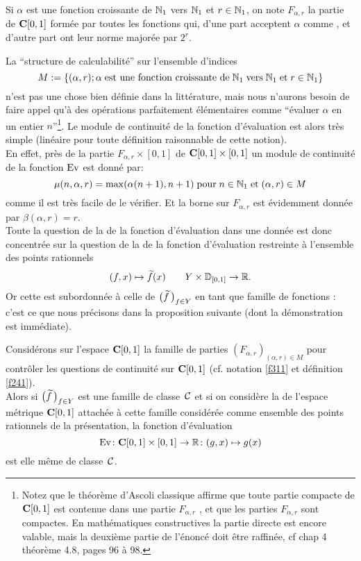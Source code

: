 \begin{fnotation}  \label{f311}
Si  $\alpha$  est une fonction croissante de  $\mathbb {N}_1$ vers  $\mathbb {N}_1$  et  $r 
\in \mathbb {N}_1$,  on note  $F_{\alpha,r}$  la partie de  ${{\bf C}[0,1]}$  formée par toutes 
les fonctions qui, d'une part acceptent  $\alpha$   comme \mcu, et d'autre part 
ont leur norme majorée par  $2^r$.
\end{fnotation}

La ``structure de calculabilité''  sur l'ensemble d'indices  
$$M := \{ (\alpha,r); \alpha \; \hbox{est une  fonction croissante de} \;
 \mathbb {N}_1 \;\hbox{vers} \; \mathbb {N}_1 \; \hbox{et} \; r \in \mathbb {N}_1 \}$$
n'est pas une chose bien définie dans la littérature, mais nous n'aurons 
besoin de faire appel qu'à des opérations parfaitement élémentaires 
comme ``évaluer  $\alpha$  en un entier  $n$''{\footnote{Notez que le 
théorème d'Ascoli classique affirme que toute partie compacte de ${{\bf C}[0,1]}$ 
est contenue dans une partie $F_{\alpha,r}$ , et que les parties  $F_{\alpha,r}$   
sont compactes. En mathématiques constructives la partie directe est encore 
valable, mais la deuxième partie de l'énoncé doit être raffinée, cf 
\cite{fBB} chap 4 théorème 4.8, pages 96 à 98.}}.
Le module de continuité de la fonction d'évaluation est alors très 
simple (\uni linéaire pour toute définition raisonnable de cette notion).\\
En effet, près de la partie  $F_{\alpha, r} \times [0,1]$    de  ${{\bf C}[0,1]} \times 
[0,1]$   un module de continuité de la fonction ${\rm Ev}$ est donné par:
$$\mu(n,\alpha,r) = \max (\alpha(n+1),n+1) \; \hbox{pour} \; n \in \mathbb {N}_1 \; 
\hbox{et} \; (\alpha,r) \in M
$$                             
comme il est très facile de le vérifier. Et la borne sur  $F_{\alpha,r}$  
est évidemment donnée par  $\beta(\alpha,r) = r$.\\
Toute la question de la \com de la fonction d'évaluation dans une \pres 
donnée est donc concentrée sur la question de la \com de la fonction 
d'évaluation restreinte à l'ensemble des points rationnels  
$$(f,x) \mapsto \widetilde{f}(x) \qquad  Y \times \mathbb {D}_{[0,1]} \rightarrow \mathbb {R}.$$
Or cette \com est subordonnée à celle de  
$\big(\widetilde{f}\,\big)_{f \in Y}$  en tant que famille de fonctions \unicosz: c'est 
ce que nous précisons dans la proposition suivante (dont la démonstration est immédiate).

\begin{fproposition} \label{f312}
Considérons sur l'espace  ${{\bf C}[0,1]}$  la famille de parties  
$(F_{\alpha,r})_{(\alpha,r) \in M}$  pour contrôler les questions de 
continuité sur  ${{\bf C}[0,1]}$  (cf. notation \ref{f311} et définition \ref{f241}).\\  
Alors si   $\big(\widetilde{f}\,\big)_{f \in Y}$  est une famille \uni de classe~${{\cal C}}$    
et si on considère la \rp  de l'espace métrique  ${{\bf C}[0,1]}$  attachée à 
cette famille considérée comme ensemble des points rationnels de la 
présentation, la fonction d'évaluation      
$${\rm Ev} \colon  {{\bf C}[0,1]} \times [0,1] \rightarrow \mathbb {R} \colon  (g,x) \mapsto g(x)$$
est elle même de classe~${{\cal C}}$.
\end{fproposition}

